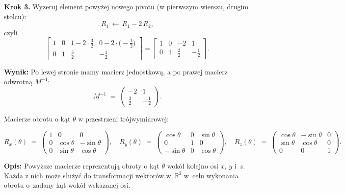 \noindent
\textbf{Krok 3.} Wyzeruj element powyżej nowego pivotu (w pierwszym wierszu, drugim \mbox{stolcu}):
\[
R_1 \,\leftarrow\, R_1 - 2\,R_2,
\]
czyli
\[
\left[
\begin{array}{cc|cc}
1 & 0 & 1 - 2\cdot\tfrac32 & 0 - 2\cdot\bigl(-\tfrac12\bigr) \\
0 & 1 & \tfrac32 & -\tfrac12
\end{array}
\right]
=
\left[
\begin{array}{cc|cc}
1 & 0 & -2 & 1 \\
0 & 1 & \tfrac32 & -\tfrac12
\end{array}
\right].
\]

\noindent
\textbf{Wynik:} Po lewej stronie mamy macierz jednostkową, a po prawej macierz odwrotną $M^{-1}$:
\[
M^{-1} 
\;=\;
\begin{pmatrix}
-2 & 1 \\
\tfrac{3}{2} & -\tfrac{1}{2}
\end{pmatrix}.
\]





\vspace{1em}
\noindent
Macierze obrotu o kąt \(\theta\) w przestrzeni trójwymiarowej:

\[
R_x(\theta) \;=\;
\begin{pmatrix}
1 & 0 & 0 \\
0 & \cos\theta & -\sin\theta \\
0 & \sin\theta & \cos\theta
\end{pmatrix},
\quad
R_y(\theta) \;=\;
\begin{pmatrix}
\cos\theta & 0 & \sin\theta \\
0 & 1 & 0 \\
-\sin\theta & 0 & \cos\theta
\end{pmatrix},
\quad
R_z(\theta) \;=\;
\begin{pmatrix}
\cos\theta & -\sin\theta & 0 \\
\sin\theta & \cos\theta & 0 \\
0 & 0 & 1
\end{pmatrix}.
\]

\noindent
\textbf{Opis:} Powyższe macierze reprezentują obroty o kąt \(\theta\) wokół kolejno osi \(x\), \(y\) i~\(z\). Każda z nich może służyć do transformacji wektorów w~\(\mathbb{R}^3\) w~celu wykonania obrotu o~zadany kąt wokół wskazanej osi.






